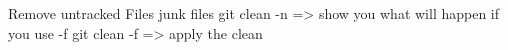 Remove untracked Files  junk files 
git clean -n  => show you what will happen if you use -f    
git clean -f  => apply the clean 